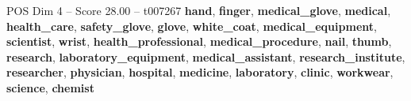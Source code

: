 \begin{textsample}{POS Dim 4 – Score 28.00 – t007267}  \label{ex:f4_pos_030}
\textbf{hand}, \textbf{finger}, \textbf{medical\_glove}, \textbf{medical}, \textbf{health\_care}, \textbf{safety\_glove}, \textbf{glove}, \textbf{white\_coat}, \textbf{medical\_equipment}, \textbf{scientist}, \textbf{wrist}, \textbf{health\_professional}, \textbf{medical\_procedure}, \textbf{nail}, \textbf{thumb}, \textbf{research}, \textbf{laboratory\_equipment}, \textbf{medical\_assistant}, \textbf{research\_institute}, \textbf{researcher}, \textbf{physician}, \textbf{hospital}, \textbf{medicine}, \textbf{laboratory}, \textbf{clinic}, \textbf{workwear}, \textbf{science}, \textbf{chemist}

\end{textsample}

